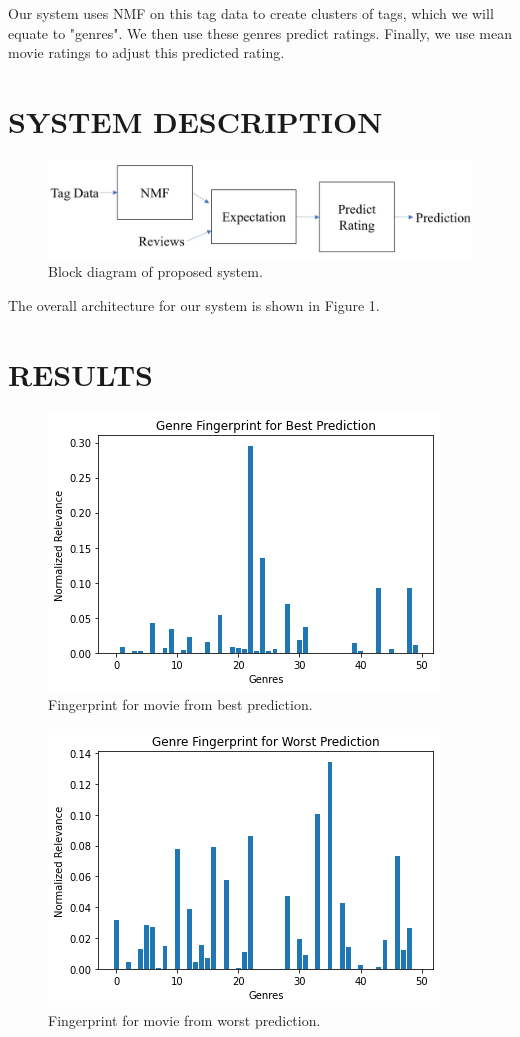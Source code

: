 \documentclass[letterpaper, 10 pt, conference]{ieeeconf}  %
\begin{document}
Our system uses NMF on this tag data to create clusters of tags, which we will equate to "genres". We then use these genres predict ratings. Finally, we use mean movie ratings to adjust this predicted rating.


\section{SYSTEM DESCRIPTION}

\begin{figure}[h]
   \includegraphics[scale=0.5]{./figs/blockdiagram.jpg}
   \caption{Block diagram of proposed system.}
\end{figure}


The overall architecture for our system is shown in Figure 1.


\section{RESULTS}
\begin{figure}[h]
   \includegraphics[scale=0.5]{./figs/bestfingerprint.png}
   \caption{Fingerprint for movie from best prediction.}
\end{figure}

\begin{figure}[h]
   \includegraphics[scale=0.5]{./figs/worstfingerprint.png}
   \caption{Fingerprint for movie from worst prediction.}
\end{figure}
\end{document}
